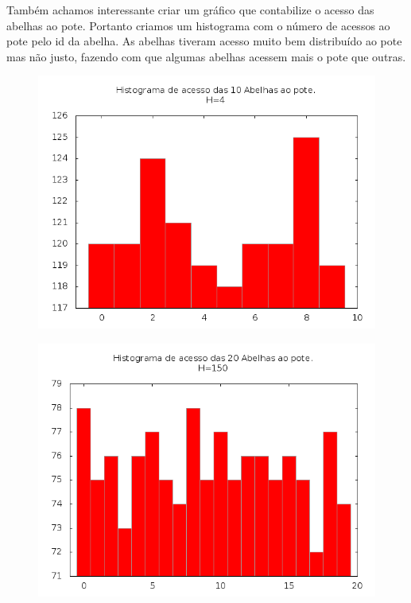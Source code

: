 \documentclass[12pt,a4paper]{article}
\begin{document}
Também achamos interessante criar um gráfico que contabilize o acesso das abelhas ao pote. Portanto criamos um histograma com o número de acessos ao pote pelo id da abelha. As abelhas tiveram acesso muito bem distribuído ao pote mas não justo, fazendo com que algumas abelhas acessem mais o pote que outras.

\begin{figure}[!htb]
\centering
\includegraphics[width=0.7\paperwidth]{./graficos/histograma_10_30_4_10_100.png}
\label{Rotulo}
\end{figure}

\begin{figure}[!htb]
\centering
\includegraphics[width=0.7\paperwidth]{./graficos/histograma_20_1_150_1000_100000.png}
\label{Rotulo}
\end{figure}
\end{document}
